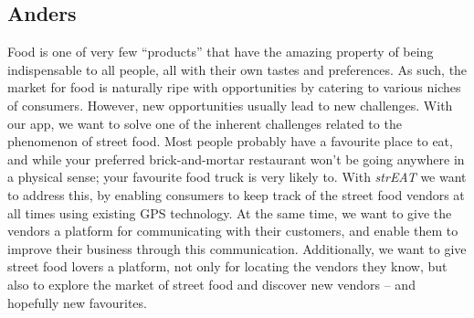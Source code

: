 \subsection{Anders}
Food is one of very few “products” that have the amazing property of being indispensable to all people, all with their own tastes and preferences. As such, the market for food is naturally ripe with opportunities by catering to various niches of consumers. However, new opportunities usually lead to new challenges. With our app, we want to solve one of the inherent challenges related to the phenomenon of street food. Most people probably have a favourite place to eat, and while your preferred brick-and-mortar restaurant won’t be going anywhere in a physical sense; your favourite food truck is very likely to. With \textit{strEAT} we want to address this, by enabling consumers to keep track of the street food vendors at all times using existing GPS technology. At the same time, we want to give the vendors a platform for communicating with their customers, and enable them to improve their business through this communication. Additionally, we want to give street food lovers a platform, not only for locating the vendors they know, but also to explore the market of street food and discover new vendors – and hopefully new favourites.
